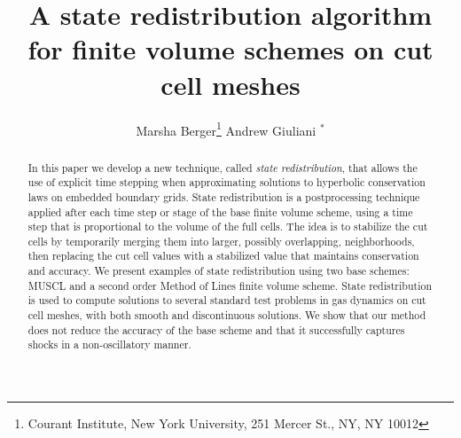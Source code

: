 \documentclass[12pt]{article}
\begin{document}
\date{}

\title{A state redistribution algorithm for finite volume schemes
on cut cell meshes}
\author{Marsha Berger\footnote{Courant Institute, New York University, 251 Mercer St.,
NY, NY 10012}  \hspace{1in} Andrew Giuliani $^*$}

\maketitle

\begin{abstract}
In this paper we develop a new technique, called \textit{state redistribution}, 
that allows the use of explicit time stepping when approximating
solutions to hyperbolic conservation laws on embedded boundary grids.  
State redistribution is a postprocessing technique applied after each time 
step or stage of the base finite volume scheme, using a time step
that is proportional to the volume of the full cells.  The idea is to 
stabilize the cut cells by temporarily merging them into larger, 
possibly overlapping, neighborhoods, 
then replacing the cut cell values with a stabilized value
that maintains conservation and accuracy.
We present examples of state redistribution using two base schemes:
MUSCL and a second order Method of Lines finite volume scheme. 
State redistribution is used to compute solutions to several 
standard test problems in gas dynamics on cut cell meshes, with both
smooth and discontinuous solutions. We show that our method does not 
reduce the accuracy of the base scheme and 
that it successfully captures shocks in a non-oscillatory manner.
\end{abstract}







%




\newpage
\small


\end{document}
